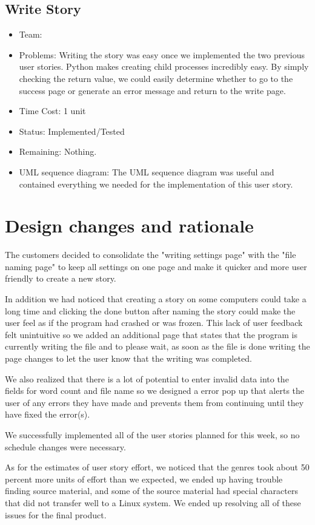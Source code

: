 \documentclass[12pt]{article}
\begin{document}
\subsection{Write Story}
\begin{itemize}
\item Team:
\item Problems: Writing the story was easy once we implemented the two previous user stories. Python makes creating child processes incredibly easy. By simply checking the return value, we could easily determine whether to go to the success page or generate an error message and return to the write page.
\item Time Cost: 1 unit 
\item Status: Implemented/Tested
\item Remaining: Nothing.
\item UML sequence diagram: The  UML sequence diagram was useful and contained everything we needed for the implementation of this user story.
\end{itemize}

\section{Design changes and rationale}

The customers decided to consolidate the "writing settings page" with the "file naming page" to keep all settings on one page and make it quicker and more user friendly to create a new story. 

In addition we had noticed that creating a story on some computers could take a long time and clicking the done button after naming the story could make the user feel as if the program had crashed or was frozen. This lack of user feedback felt unintuitive so we added an additional page that states that the program is currently writing the file and to please wait, as soon as the file is done writing the page changes to let the user know that the writing was completed.   
 
We also realized that there is a lot of potential to enter invalid data into the fields for word count and file name so we designed a error pop up that alerts the user of any errors they have made and prevents them from continuing until they have fixed the error(s).

We successfully implemented all of the user stories planned for this week, so no schedule changes were necessary.

As for the estimates of user story effort, we noticed that the genres took about 50 percent more units of effort than we expected, we ended up having trouble finding source material, and some of the source material had special characters that did not transfer well to a Linux system. We ended up resolving all of these issues for the final product. 
\end{document}
